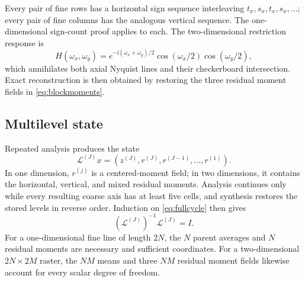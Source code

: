 Every pair of fine rows has a horizontal sign sequence interleaving
\(t_x,s_x,t_x,s_x,\ldots\); every pair of fine columns has the analogous
vertical sequence. The one-dimensional sign-count proof applies to each.
The two-dimensional restriction response is
\begin{equation}
 H(\omega_x,\omega_y)=e^{-\mathrm i(\omega_x+\omega_y)/2}
 \cos(\omega_x/2)\cos(\omega_y/2),
 \label{eq:nyquist2d}
\end{equation}
which annihilates both axial Nyquist lines and their checkerboard
intersection. Exact reconstruction is then obtained by restoring the three
residual moment fields in \eqref{eq:blockmoments}.

\subsection{Multilevel state}

Repeated analysis produces the state
\begin{equation}
 \mathcal L^{(J)}x=
 \left(z^{(J)},r^{(J)},r^{(J-1)},\ldots,r^{(1)}\right).
 \label{eq:multilevel}
\end{equation}
In one dimension, \(r^{(j)}\) is a centered-moment field; in two dimensions,
it contains the horizontal, vertical, and mixed residual moments. Analysis
continues only while every resulting coarse axis has at least five cells, and
synthesis restores the stored levels in reverse order. Induction on
\eqref{eq:fullcycle} then gives
\begin{equation}
 (\mathcal L^{(J)})^{-1}\mathcal L^{(J)}=I.
 \label{eq:multilevelinverse}
\end{equation}
For a one-dimensional fine line of length \(2N\), the \(N\) parent averages
and \(N\) residual moments are necessary and sufficient coordinates. For a
two-dimensional \(2N\times2M\) raster, the \(NM\) means and three \(NM\)
residual moment fields likewise account for every scalar degree of freedom.
